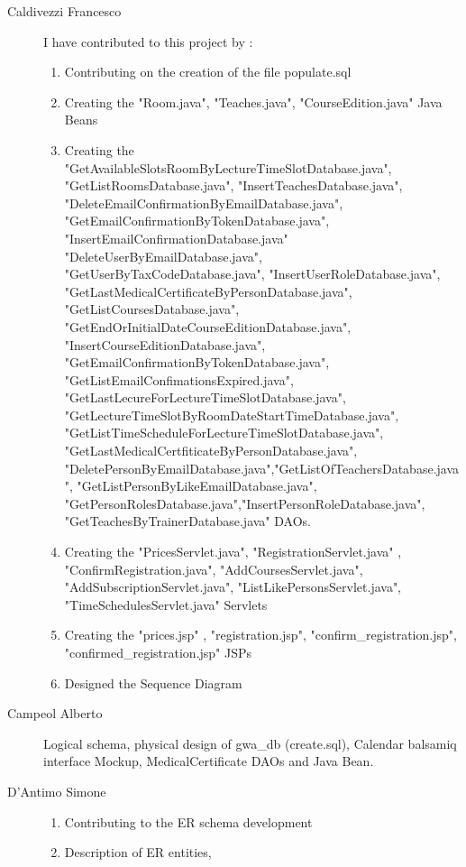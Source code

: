 \begin{description}
	\item[Caldivezzi Francesco] I have contributed to this project by :
		\begin{flushleft}
			\begin{enumerate}
				\item Contributing on the creation of the file populate.sql
				\item Creating the "Room.java", "Teaches.java", "CourseEdition.java" Java Beans
				\item Creating the "GetAvailableSlotsRoomByLectureTimeSlotDatabase.java", "GetListRoomsDatabase.java", "InsertTeachesDatabase.java", 	"DeleteEmailConfirmationByEmailDatabase.java", "GetEmailConfirmationByTokenDatabase.java", "InsertEmailConfirmationDatabase.java" "DeleteUserByEmailDatabase.java", "GetUserByTaxCodeDatabase.java", "InsertUserRoleDatabase.java", "GetLastMedicalCertificateByPersonDatabase.java", "GetListCoursesDatabase.java", "GetEndOrInitialDateCourseEditionDatabase.java",  "InsertCourseEditionDatabase.java", "GetEmailConfirmationByTokenDatabase.java", "GetListEmailConfimationsExpired.java", "GetLastLecureForLectureTimeSlotDatabase.java", "GetLectureTimeSlotByRoomDateStartTimeDatabase.java", "GetListTimeScheduleForLectureTimeSlotDatabase.java", "GetLastMedicalCertfiticateByPersonDatabase.java", "DeletePersonByEmailDatabase.java","GetListOfTeachersDatabase.java", "GetListPersonByLikeEmailDatabase.java", "GetPersonRolesDatabase.java","InsertPersonRoleDatabase.java", "GetTeachesByTrainerDatabase.java" DAOs.
				\item Creating the "PricesServlet.java", "RegistrationServlet.java" , "ConfirmRegistration.java", "AddCoursesServlet.java", "AddSubscriptionServlet.java", "ListLikePersonsServlet.java", "TimeSchedulesServlet.java" Servlets
				\item Creating the "prices.jsp" , "registration.jsp", "confirm\_registration.jsp", "confirmed\_registration.jsp" JSPs	
				\item Designed the Sequence Diagram			 		
			\end{enumerate}
		\end{flushleft}
	\item[Campeol Alberto] Logical schema, physical design of gwa\_db (create.sql), Calendar balsamiq interface Mockup, MedicalCertificate DAOs and Java Bean.
	\item[D'Antimo Simone] 
	\begin{enumerate}
		\item Contributing to the ER schema development
		\item Description of ER entities,

\end{enumerate}
\end{description}
